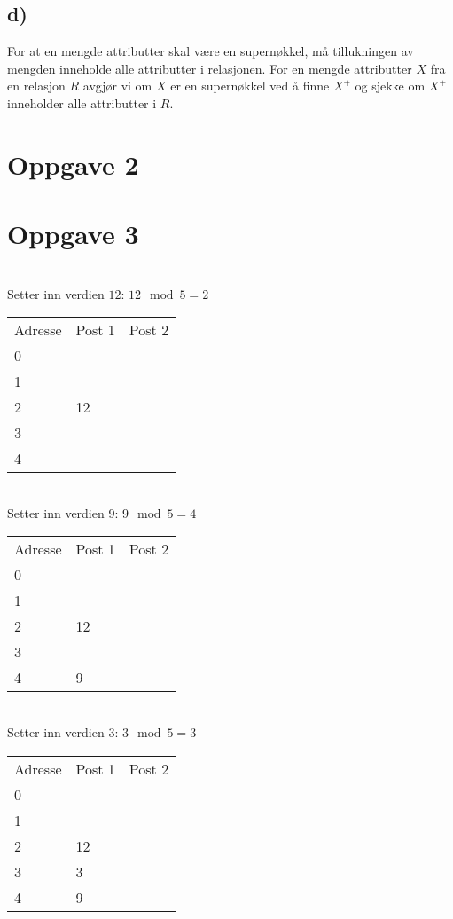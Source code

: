 \documentclass[a4paper, 12pt] {article}
\begin{document}
\subsection{d)}

For at en mengde attributter skal være en supernøkkel, må tillukningen av mengden inneholde alle attributter i relasjonen. For en mengde attributter $X$ fra en relasjon $R$ avgjør vi om $X$ er en supernøkkel ved å finne $X^+$ og sjekke om $X^+$ inneholder alle attributter i $R$.

\section{Oppgave 2}

\newpage
\section{Oppgave 3}
~\\
Setter inn verdien $12$: $12 \mod 5 = 2$\\
\begin{tabular}{|l|l|l|}
    \hline
    Adresse & Post 1 & Post 2 \\
    0       & ~      & ~      \\
    1       & ~      & ~      \\
    2       & 12     & ~      \\
    3       & ~      & ~      \\
    4       & ~      & ~      \\ \hline
\end{tabular}

~\\
Setter inn verdien $9$: $9 \mod 5 = 4$\\
\begin{tabular}{|l|l|l|}
    \hline
    Adresse & Post 1 & Post 2 \\
    0       & ~      & ~      \\
    1       & ~      & ~      \\
    2       & 12     & ~      \\
    3       & ~      & ~      \\
    4       & 9      & ~      \\ \hline
\end{tabular}

~\\
Setter inn verdien $3$: $3 \mod 5 = 3$\\
\begin{tabular}{|l|l|l|}
    \hline
    Adresse & Post 1 & Post 2 \\
    0       & ~      & ~      \\
    1       & ~      & ~      \\
    2       & 12     & ~      \\
    3       & 3      & ~      \\
    4       & 9      & ~      \\ \hline
\end{tabular}
\end{document}
